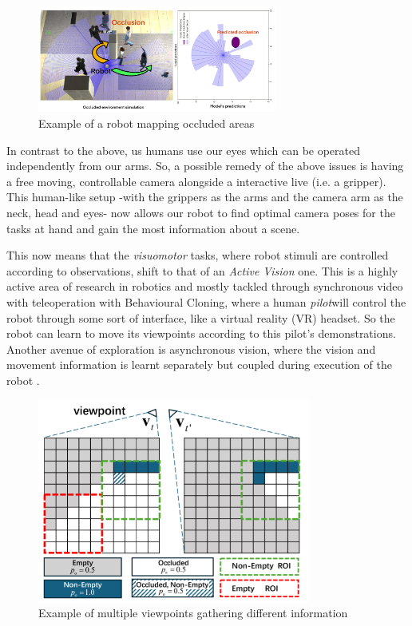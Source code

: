   \begin{figure}[h]
    \centering
    \includegraphics[width=0.7\textwidth]{assets/intro/intro-occlusion.png}
    \caption{Example of a robot mapping occluded areas \cite{ranaraja2024occlusionawareobstacleprediction}}\label{fig:ex-occlusion}
  \end{figure}
    
  In contrast to the above, us humans use our eyes which can be operated independently from our arms.  So, a possible remedy of the above issues is having a free moving, controllable camera alongside a interactive live (i.e. a gripper). This human-like setup -with the grippers as the arms and the camera arm as the neck, head and eyes- now allows our robot to find optimal camera poses for the tasks at hand and gain the most information about a scene.
  
  This now means that the \emph{visuomotor} tasks, where robot stimuli are controlled according to observations, shift to that of an \emph{Active Vision} one. This is a highly active area of research in robotics and mostly tackled through synchronous video with teleoperation \cite{exploringActiveVision2024chuang} with Behavioural Cloning, where a human \emph{pilot}will control the robot through some sort of interface, like a virtual reality (VR) headset. So the robot can learn to move its viewpoints according to this pilot's demonstrations. Another avenue of exploration is asynchronous vision, where the vision and movement information is learnt separately but coupled during execution of the robot \cite{natarajan2021graspsynthesisnovelobjects,wang2024observeactasynchronousactive}.


  \begin{figure}[h]
    \centering
    \includegraphics[width=0.8\textwidth]{assets/intro/grid-occluded.png}
    \caption{Example of multiple viewpoints gathering different information \cite{wang2024observeactasynchronousactive}}\label{fig:grid-occlusion}
  \end{figure}

